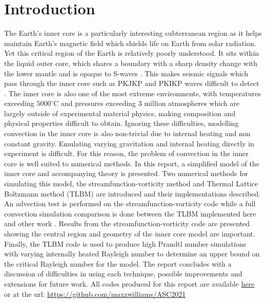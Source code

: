 \documentclass{article}
\begin{document}
\section*{Introduction}
The Earth's inner core is a particularly interesting subterranean region as it helps maintain Earth's magnetic field which shields life on Earth from
solar 
radiation. Yet this critical region of the Earth is relatively poorly understood. It sits within the liquid outer core, which shares a boundary with a sharp 
density change with the lower mantle and is opaque to S-waves \cite{fowler1990solid}. This makes seismic signals which pass through the inner core such 
as PKJKP and PKIKP waves difficult to detect \cite{tkalvcic2018shear, bolt1970pdp}. The inner core is also one of the most extreme environments, with 
temperatures exceeding $5000^{\circ}$C and pressures exceeding 3 million atmospheres which are 
largely outside of experimental material physics, making composition and physical properties difficult to obtain. Ignoring these difficulties, modelling 
convection in the inner core is also non-trivial due to internal heating and non constant gravity. Emulating varying gravitation and internal heating 
directly in experiment is difficult. For this reason, the problem of convection in the inner core is well suited to numerical methods. 
\newline
\noindent In this report, a simplified model of the inner core and accompanying theory is presented. Two numerical methods for simulating this model, the streamfunction-vorticity method and Thermal Lattice Boltzmann method (TLBM) are introduced
and their implementations described. An advection test is performed on the streamfunction-vorticity code while a full convection simulation comparison is done between the TLBM 
implemented here and other work \cite{mora2017simulation}. Results from the streamfunction-vorticity code are presented showing the central region and geometry of the inner core model are important.
Finally, the TLBM code is used to produce high Prandtl number simulations with varying internally heated Rayleigh number to determine an upper bound on the critical Rayleigh number
for the model. The report concludes with a discussion of difficulties in using each technique, possible improvements and extensions for future work.
\vspace{0.3cm}
\newline
\noindent All codes produced for this report are available \href{https://github.com/maxzwilliams/ASC2021}{here} or at the url: \url{https://github.com/maxzwilliams/ASC2021}
\end{document}

